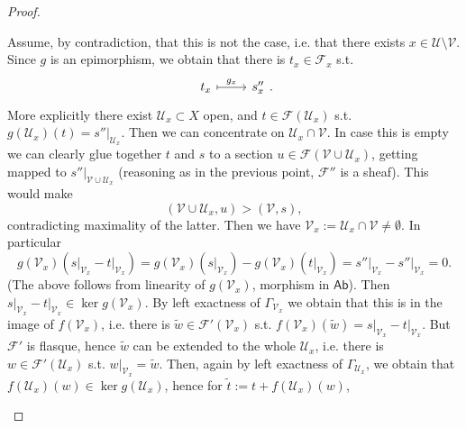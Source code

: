 \documentclass[../Main]{subfiles}
\begin{document}
\begin{proof}
\begin{enumerate}
		Assume, by contradiction, that this is not the case,
		i.e. that there exists $x \in \mathcal{U} \setminus \mathcal{V}$.
		Since $g$ is an epimorphism, we obtain that there is $t_x \in \mathcal{F}_x$
		s.t.
		\begin{equation}
		\begin{tikzcd}
			t_x \arrow[r, "g_x", mapsto] & s''_x
		\end{tikzcd}
		.\end{equation}
		More explicitly there exist $\mathcal{U}_x \subset X$ open, and
		$t \in \mathcal{F}(\mathcal{U}_x)$ s.t.
		$g(\mathcal{U}_x)(t) = \left.s''\right|_{\mathcal{U}_x}$.
		Then we can concentrate on $\mathcal{U}_x \cap \mathcal{V}$.
		In case this is empty we can clearly glue together $t$ and $s$ to a section
		$u \in \mathcal{F}(\mathcal{V}\cup \mathcal{U}_x)$, getting mapped to
		$\left.s''\right|_{\mathcal{V}\cup \mathcal{U}_x}$
		(reasoning as in the previous point, $\mathcal{F}''$ is a sheaf).
		This would make
		\begin{equation}
		\left(\mathcal{V} \cup \mathcal{U}_x, u \right) >
		\left(\mathcal{V}, s\right)
		,\end{equation}
		contradicting maximality of the latter.
		Then we have $\mathcal{V}_x := \mathcal{U}_x \cap \mathcal{V} \neq \emptyset$.
		In particular
		\begin{equation}
			g(\mathcal{V}_x) \left( \left.s\right|_{\mathcal{V}_x} -
					\left.t\right|_{\mathcal{V}_x} \right) =
			g(\mathcal{V}_x) \left( \left.s\right|_{\mathcal{V}_x}\right) -
			g(\mathcal{V}_x) \left( \left.t\right|_{\mathcal{V}_x}\right) =
			\left.s''\right|_{\mathcal{V}_x} -
			\left.s''\right|_{\mathcal{V}_x} =
			0
		.\end{equation}
		(The above follows from linearity of $g(\mathcal{V}_x)$, morphism in $\mathsf{Ab}$).
		Then $\left.s\right|_{\mathcal{V}_x} -
			\left.t\right|_{\mathcal{V}_x} \in \ker g(\mathcal{V}_x)$.
		By left exactness of $\Gamma_{\mathcal{V}_x}$ we obtain that this is in the image
		of $f(\mathcal{V}_x)$, i.e. there is $\tilde{w} \in \mathcal{F}'(\mathcal{V}_x)$
		s.t. $f(\mathcal{V}_x)(\tilde{w}) =
		\left.s\right|_{\mathcal{V}_x} - \left.t\right|_{\mathcal{V}_x}$.
		But $\mathcal{F}'$ is flasque, hence $\tilde{w}$ can be extended to the whole
		$\mathcal{U}_x$, i.e. there is $w \in \mathcal{F}'(\mathcal{U}_x)$ s.t.
		$\left.w\right|_{\mathcal{V}_x} = \tilde{w}$.
		Then, again by left exactness of $\Gamma_{\mathcal{U}_x}$, we obtain that
		$f(\mathcal{U}_x)(w) \in \ker g(\mathcal{U}_x)$, hence
		for $\tilde{t} := t + f(\mathcal{U}_x)(w)$,

\end{enumerate}
\end{proof}
\end{document}
